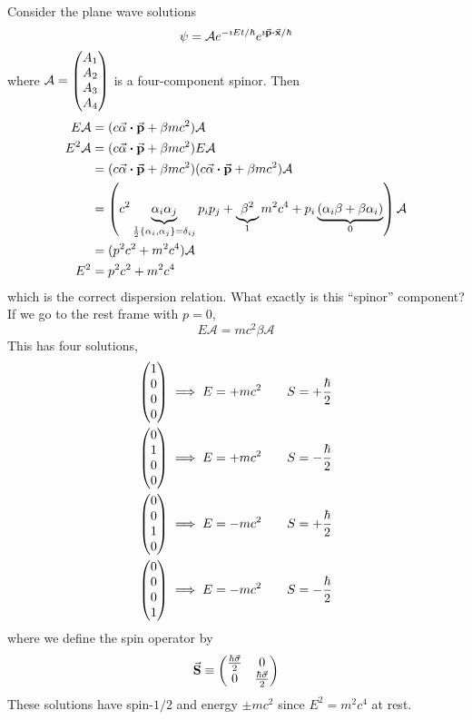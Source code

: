 \documentclass[a4paper,twoside,master.tex]{subfiles}
\begin{document}
Consider the plane wave solutions
\begin{equation}
    \psi = \mathcal{A} e^{- \imath E t / \hbar} e^{\imath \va{p} \vdot \va{x} / \hbar}
\end{equation}
where $ \mathcal{A} = \mqty(A_1\\A_2\\A_3\\A_4) $ is a four-component spinor. Then
\begin{align}
    E \mathcal{A} &= (c \va{\alpha} \vdot \va{p} + \beta m c^2) \mathcal{A} \\
    E^2 \mathcal{A} &= (c \va{\alpha} \vdot \va{p} + \beta m c^2) E \mathcal{A} \\
                    &= (c \va{\alpha} \vdot \va{p} + \beta m c^2)(c \va{\alpha} \vdot \va{p} + \beta m c^2) \mathcal{A} \\
                    &= \left( c^2 \underbrace{\alpha_i \alpha_j}_{\frac{1}{2} \pb{\alpha_i}{\alpha_j} = \delta_{ij}}p_i p_j + \underbrace{\beta^2}_{1} m^2 c^4 + p_i \underbrace{(\alpha_i \beta + \beta \alpha_i)}_{0} \right) \mathcal{A} \\
                    &= (p^2 c^2 + m^2 c^4) \mathcal{A} \\
    E^2 &= p^2 c^2 + m^2 c^4
\end{align}
which is the correct dispersion relation. What exactly is this ``spinor'' component? If we go to the rest frame with $ p = 0 $,
\begin{equation}
    E \mathcal{A} = m c^2 \beta \mathcal{A}
\end{equation}
This has four solutions,
\begin{align}
    \mqty(1\\0\\0\\0) \implies E &= + m c^2 \qquad S = + \frac{\hbar}{2} \\
    \mqty(0\\1\\0\\0) \implies E &= + m c^2 \qquad S = - \frac{\hbar}{2} \\
    \mqty(0\\0\\1\\0) \implies E &= - m c^2 \qquad S = + \frac{\hbar}{2} \\
    \mqty(0\\0\\0\\1) \implies E &= - m c^2 \qquad S = - \frac{\hbar}{2}
\end{align}
where we define the spin operator by
\begin{equation}
    \va{S} \equiv \mqty(\frac{\hbar \va{\sigma}}{2} & 0 \\ 0 & \frac{\hbar \va{\sigma}}{2})
\end{equation}
These solutions have spin-$ 1/2 $ and energy $ \pm m c^2 $ since $ E^2 = m^2 c^4 $ at rest.
\end{document}
